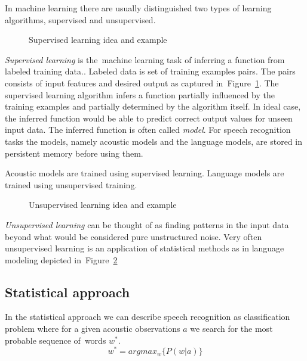 In machine learning there are usually distinguished two types of learning algorithms, supervised and unsupervised.

\begin{figure}[!htp]
    \begin{center}
    
    
    \caption{Supervised learning idea and example}
    \label{fig:supervised} 
    \end{center}
\end{figure}
{\it Supervised learning}\/ is the~machine learning task of inferring a function from labeled training data.\cite{mohri2012foundations}. Labeled data is set of training examples pairs. The pairs consists of input features and desired output as captured in~Figure~\ref{fig:supervised}. The supervised learning algorithm infers a function partially influenced by the training examples and partially determined by the algorithm itself. In ideal case, the inferred function would be able to predict correct output values for unseen input data. 
The inferred function is often called {\it model}. For speech recognition tasks the models, namely acoustic models and the language models, are stored in persistent memory before using them. 

Acoustic models are trained using supervised learning. Language models are trained using unsupervised training. 

\begin{figure}[!htp]
    \begin{center}
    
    
    \caption{Unsupervised learning idea and example}
    \label{fig:unsupervised} 
    \end{center}
\end{figure}
{\it Unsupervised learning}\/ can be thought of as finding patterns in the input data beyond what would be considered pure unstructured noise\cite{ghahramani2004unsupervised}. Very often unsupervised learning is an application of statistical methods as in language modeling depicted in~Figure~\ref{fig:unsupervised}

\subsection*{Statistical approach}
\label{sub:statistical_approach}
In the statistical approach we can describe speech recognition as classification problem where for a given acoustic observations $a$ we search for the most probable sequence of~words $w^*$.
\begin{equation}\label{eq:asr}
    w^* = argmax_{w}\{P(w|a)\} 
\end{equation}

